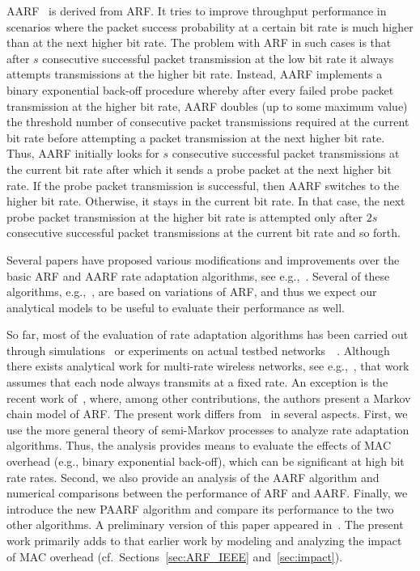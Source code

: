 \documentclass[11pt, journal, letterpaper, oneside, onecolumn]{IEEEtran}
\begin{document}
AARF~\cite{AARF} is derived from ARF. It tries to improve
throughput performance in scenarios where the packet success
probability at a certain bit rate is much higher than at the next
higher bit rate. The problem with ARF in such cases is that after
$s$ consecutive successful packet transmission at the low bit rate
it always attempts transmissions at the higher bit rate.
Instead, AARF implements a binary exponential back-off procedure
whereby after every failed probe packet transmission at the higher
bit rate, AARF doubles (up to some maximum value) the threshold
number of consecutive packet transmissions required at the current
bit rate before attempting a packet transmission at the next
higher bit rate. Thus, AARF initially looks for $s$ consecutive
successful packet transmissions at the current bit rate after
which it sends a probe packet at the next higher bit rate. If the
probe packet transmission is successful, then AARF switches
 to the higher bit rate. Otherwise, it stays in the
current bit rate. In that case, the next probe packet transmission
at the higher bit rate is attempted only after $2s$ consecutive
successful packet transmissions at the current bit rate and so
forth.







Several papers have proposed various modifications and
improvements over the basic ARF and AARF rate adaptation
algorithms, see e.g.,~\cite{Bicket,RRAA,CARA,CARA11,SNR1}. Several
of these algorithms, e.g.,~\cite{CARA,CARA11,SNR1},  are based on
variations of ARF, and thus we expect our analytical models to be
useful to evaluate their performance as well.

So far, most of the evaluation of rate adaptation algorithms has
been carried out through
simulations~\cite{AARF,CARA,AARF_3,AARF_7,AARF_12,SNR1,EACK} or
experiments on actual testbed networks~~\cite{Bicket,RRAA}.
 Although there exists analytical work for multi-rate wireless networks, see
e.g.,~\cite{WLANsingle1,WLANsingle2}, that work assumes that each
node always transmits at a fixed rate.
An exception is the recent work of~\cite{Infocomm}, where, among
other contributions, the authors present a Markov chain model of
ARF. The present work differs from~\cite{Infocomm} in several
aspects. First, we use the more general theory of semi-Markov
processes to analyze rate adaptation algorithms. Thus, the
analysis provides means to evaluate the effects of MAC overhead (e.g., binary exponential back-off),
which can be significant at high bit rate rates.
Second, we also provide an analysis of the AARF algorithm and
numerical comparisons between the performance of ARF and AARF.
Finally, we introduce the new PAARF algorithm and compare its
performance to the two other algorithms. A preliminary version of this paper appeared in~\cite{SECON07}. The present work primarily adds to that earlier work by modeling and analyzing the impact of MAC overhead (cf.~Sections~\ref{sec:ARF_IEEE} and~\ref{sec:impact}).
\end{document}

